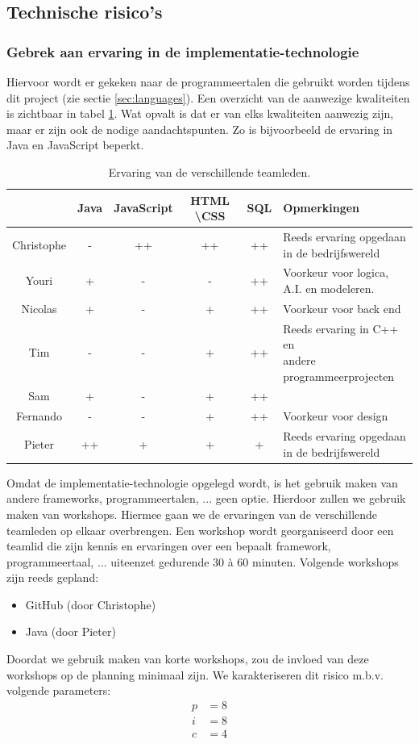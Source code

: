 \subsection{Technische risico's}
\subsubsection{Gebrek aan ervaring in de implementatie-technologie}
Hiervoor wordt er gekeken naar de programmeertalen die gebruikt worden tijdens dit project (zie sectie \ref{sec:languages}). Een overzicht van de aanwezige kwaliteiten is zichtbaar in tabel \ref{tab:skilllevel}. Wat opvalt is dat er van elks kwaliteiten aanwezig zijn, maar er zijn ook de nodige aandachtspunten. Zo is bijvoorbeeld de ervaring in Java en JavaScript beperkt.

\begin{table} [htbp]
	\centering
  	\caption{Ervaring van de verschillende teamleden.}
    \begin{tabular}{c|ccccl}
  		  	& Java 	& JavaScript & HTML \textbackslash CSS 		& SQL 	& Opmerkingen \\
  		  	\hline
  		  	Christophe & -	& ++ 		& ++ 		& ++ & \shortstack{ Reeds ervaring opgedaan \\ in de bedrijfswereld} \\
  		  	Youri & + & - & - & ++ & \shortstack{Voorkeur voor logica, \\ A.I. en modeleren.} \\
  		  	Nicolas & + & - & + & ++ & Voorkeur voor back end \\
  		  	Tim & - & - & + & ++ & \shortstack{Reeds ervaring in C++ en \\ andere programmeerprojecten} \\
  		  	Sam & + & - & + & ++ & \\
  		  	Fernando & - & - & + & ++ & Voorkeur voor design \\
  		  	Pieter & ++ & + & + & + & \shortstack{Reeds ervaring opgedaan \\ in de bedrijfswereld}
    \end{tabular}
  	\label{tab:skilllevel}
\end{table}
Omdat de implementatie-technologie opgelegd wordt, is het gebruik maken van andere frameworks, programmeertalen, ... geen optie. Hierdoor zullen we gebruik maken van workshops. Hiermee gaan we de ervaringen van de verschillende teamleden op elkaar overbrengen. Een workshop wordt georganiseerd door een teamlid die zijn kennis en ervaringen over een bepaalt framework, programmeertaal, ... uiteenzet gedurende 30 \`{a} 60 minuten. Volgende workshops zijn reeds gepland:
\begin{itemize}
	\item GitHub (door Christophe)
	\item Java (door Pieter)
\end{itemize}
Doordat we gebruik maken van korte workshops, zou de invloed van deze workshops op de planning minimaal zijn. We karakteriseren dit risico m.b.v. volgende parameters:
\begin{align*}
	p &= 8\\
	i &= 8\\
	c &= 4
\end{align*}

